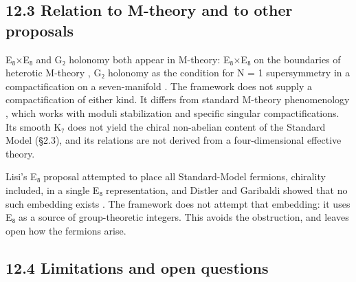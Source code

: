 \documentclass[11pt,a4paper]{article}
\begin{document}
\subsection{12.3 Relation to M-theory and to other proposals}\label{relation-to-m-theory-and-to-other-proposals}

E₈×E₈ and G₂ holonomy both appear in M-theory: E₈×E₈ on the boundaries of heterotic M-theory \cite{32}, G₂ holonomy as the condition for N = 1 supersymmetry in a compactification on a seven-manifold \cite{24,34}. The framework does not supply a compactification of either kind. It differs from standard M-theory phenomenology \cite{33,35}, which works with moduli stabilization and specific singular compactifications. Its smooth K₇ does not yield the chiral non-abelian content of the Standard Model (§2.3), and its relations are not derived from a four-dimensional effective theory.

Lisi's E₈ proposal attempted to place all Standard-Model fermions, chirality included, in a single E₈ representation, and Distler and Garibaldi showed that no such embedding exists \cite{36}. The framework does not attempt that embedding: it uses E₈ as a source of group-theoretic integers. This avoids the obstruction, and leaves open how the fermions arise.

\subsection{12.4 Limitations and open questions}\label{limitations-and-open-questions}
\end{document}
